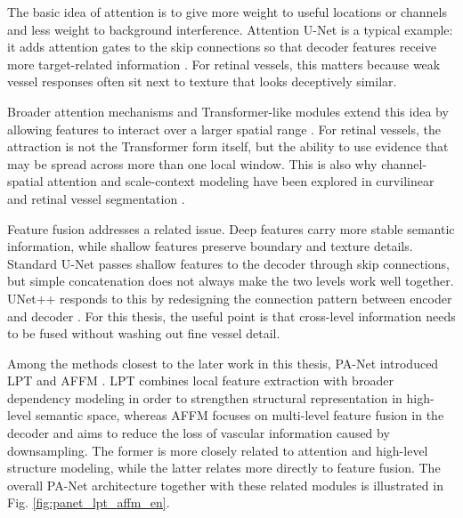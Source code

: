 \documentclass[a4paper,11pt]{article}
\begin{document}
The basic idea of attention is to give more weight to useful locations or channels and less weight to background interference. Attention U-Net is a typical example: it adds attention gates to the skip connections so that decoder features receive more target-related information \cite{oktay2018attentionunet}. For retinal vessels, this matters because weak vessel responses often sit next to texture that looks deceptively similar.

Broader attention mechanisms and Transformer-like modules extend this idea by allowing features to interact over a larger spatial range \cite{chen2024transunet,cao2021swinunet}. For retinal vessels, the attraction is not the Transformer form itself, but the ability to use evidence that may be spread across more than one local window. This is also why channel-spatial attention and scale-context modeling have been explored in curvilinear and retinal vessel segmentation \cite{mou2019csnet,wu2021scsnet}.

Feature fusion addresses a related issue. Deep features carry more stable semantic information, while shallow features preserve boundary and texture details. Standard U-Net passes shallow features to the decoder through skip connections, but simple concatenation does not always make the two levels work well together. UNet++ responds to this by redesigning the connection pattern between encoder and decoder \cite{zhou2018unetpp}. For this thesis, the useful point is that cross-level information needs to be fused without washing out fine vessel detail.

Among the methods closest to the later work in this thesis, PA-Net introduced LPT and AFFM \cite{luo2025panet}. LPT combines local feature extraction with broader dependency modeling in order to strengthen structural representation in high-level semantic space, whereas AFFM focuses on multi-level feature fusion in the decoder and aims to reduce the loss of vascular information caused by downsampling. The former is more closely related to attention and high-level structure modeling, while the latter relates more directly to feature fusion. The overall PA-Net architecture together with these related modules is illustrated in Fig. \ref{fig:panet_lpt_affm_en}.
\end{document}
